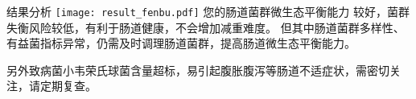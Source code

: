 \vspace*{3mm}

\begin{spacing}{1.5}

\begin{LRaside}[.8]{\fontsize{8.8pt}{11pt}\selectfont 结果分析}
\noindent
\texttt{[image: result\_fenbu.pdf]}
\asidebreak %
\fontsize{8pt}{11pt}\selectfont
您的肠道菌群微生态平衡能力
较好，菌群失衡风险较低，有利于肠道健康，不会增加减重难度。
但其中肠道菌群多样性、有益菌指标异常，仍需及时调理肠道菌群，提高肠道微生态平衡能力。


\noindent 另外致病菌小韦荣氏球菌含量超标，易引起腹胀腹泻等肠道不适症状，需密切关注，请定期复查。

\end{LRaside}

\end{spacing}



